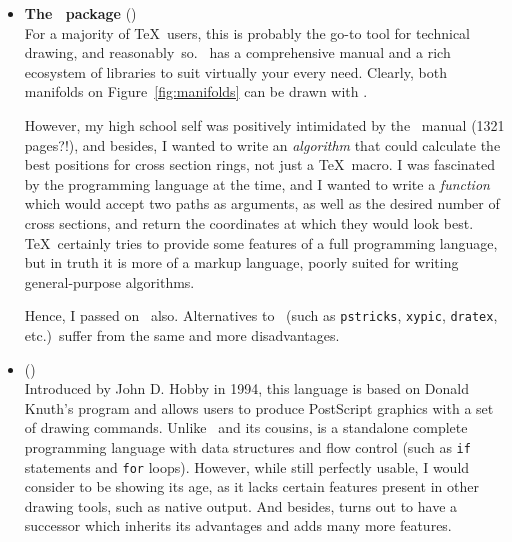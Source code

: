 \documentclass[final]{ltugboat}
\def\url{\tburl}
\begin{document}
\begin{itemize}
    To be fair, \texttt{picture} is also capable of drawing an arbitrary
    B\'ezier curve by putting it together from many black squares.
    Still, this is a pretty rudimentary tool unsuited for complicated
    technical drawing, and it's mainly used to define custom
    symbols rather than full diagrams. Pass.
  \item \textbf{The \TikZ\ package} (\url{https://tikz.dev})\\
    For a majority of \TeX\ users, this is probably the go-to tool
    for technical drawing, and reasonably~so. \TikZ\ has a
    comprehensive manual and a rich ecosystem of libraries to suit
    virtually your every need. Clearly, both manifolds on
    Figure~\ref{fig:manifolds} can be drawn with \TikZ.

    However, my high school self was positively intimidated by the
    \TikZ\ manual (1321 pages?!), and besides, I wanted to write an
    \emph{algorithm} that could calculate the best positions for cross
    section rings, not just a \TeX\ macro. I was fascinated by the
     programming language at the time, and I wanted to write
    a \emph{function} which would accept two paths as arguments, as
    well as the desired number of cross sections, and return the
    coordinates at which they would look best. \TeX\ certainly tries
    to provide some features of a full programming language, but in
    truth it is more of a markup language, poorly suited for writing
    general-purpose algorithms.
    
    Hence, I passed on \TikZ\ also.
    Alternatives to \TikZ\ (such as \texttt{pstricks},
    \texttt{xypic}, \texttt{dratex}, etc.)\ suffer from the same and
    more disadvantages.

  \item {} (\url{https://tug.org/metapost.html})\\
    Introduced by John D. Hobby in 1994, this language is based on
    Donald Knuth's  program and allows users to
    produce PostScript graphics with a set of drawing commands. Unlike
    \TikZ\ and its cousins,  is a standalone complete
    programming language with data structures and flow control (such
    as \texttt{if} statements and \texttt{for} loops). However, while
    still perfectly usable, I would consider  to be showing
    its age, as it lacks certain features present in other
    drawing tools, such as native  output. And besides,
     turns out to have a successor which inherits its
    advantages and adds many more features.
\end{itemize}
\end{document}
